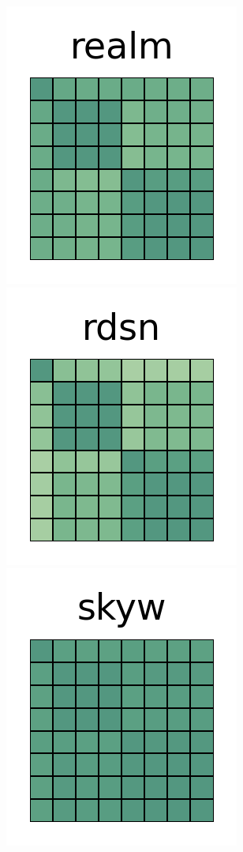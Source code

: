 \documentclass[10pt,conference]{IEEEtran}
\begin{document}
\begin{figure}[htb!]
 \includegraphics[width=\heatmapWidth, keepaspectratio]{entropy-correlations/realm-java-grids.png}
 \includegraphics[width=\heatmapWidth, keepaspectratio]{entropy-correlations/redisson-grids.png} \\
 \includegraphics[width=\heatmapWidth, keepaspectratio]{entropy-correlations/skywalking-grids.png}

\end{figure}
\end{document}
